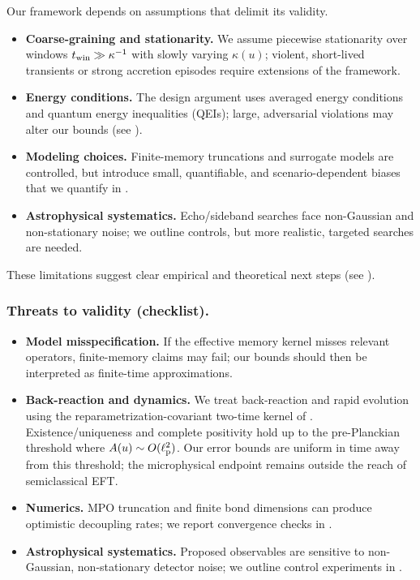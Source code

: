\documentclass[11pt,a4paper]{article}
\theoremstyle{plain}
\theoremstyle{definition}
\theoremstyle{remark}
\begin{document}
Our framework depends on assumptions that delimit its validity.
\begin{itemize}[leftmargin=*]
  \item \textbf{Coarse-graining and stationarity.} We assume piecewise stationarity over windows $t_{\rm win}\gg \kappa^{-1}$ with slowly varying $\kappa(u)$; violent, short-lived transients or strong accretion episodes require extensions of the framework.
  \item \textbf{Energy conditions.} The design argument uses averaged energy conditions and quantum energy inequalities (QEIs); large, adversarial violations may alter our bounds (see ).
  \item \textbf{Modeling choices.} Finite-memory truncations and surrogate models are controlled, but introduce small, quantifiable, and scenario-dependent biases that we quantify in .
  \item \textbf{Astrophysical systematics.} Echo/sideband searches face non-Gaussian and non-stationary noise; we outline controls, but more realistic, targeted searches are needed.
\end{itemize}
These limitations suggest clear empirical and theoretical next steps (see ).

\subsubsection{Threats to validity (checklist).}
\begin{itemize}[leftmargin=*,itemsep=0.25em]
  \item \textbf{Model misspecification.} If the effective memory kernel misses relevant operators, finite-memory claims may fail; our bounds should then be interpreted as finite-time approximations.
  \item \textbf{Back-reaction and dynamics.} We treat back-reaction and rapid evolution using the reparametrization-covariant two-time kernel of . Existence/uniqueness and complete positivity hold up to the pre-Planckian threshold where $A(u)\sim O(\ell_{\rm p}^2)$. Our error bounds are uniform in time away from this threshold; the microphysical endpoint remains outside the reach of semiclassical EFT.
  \item \textbf{Numerics.} MPO truncation and finite bond dimensions can produce optimistic decoupling rates; we report convergence checks in .
  \item \textbf{Astrophysical systematics.} Proposed observables are sensitive to non-Gaussian, non-stationary detector noise; we outline control experiments in .
\end{itemize}
\end{document}
